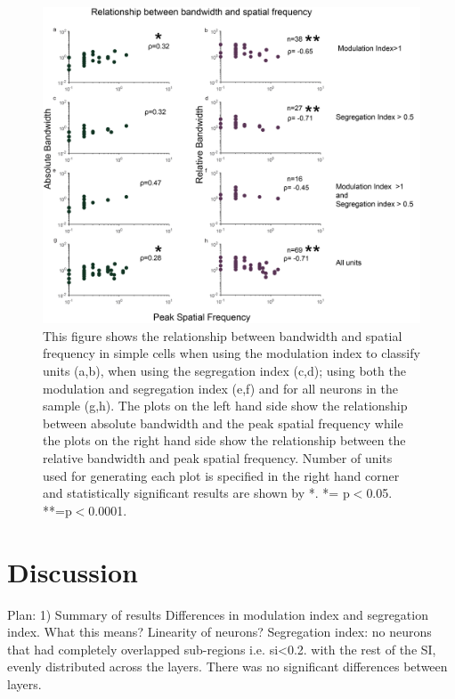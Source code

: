 		\begin{figure}[]
		
		\includegraphics[width=\linewidth]{LinearV1/hwpksf.jpg}
		\caption{This figure shows the relationship between bandwidth and spatial frequency in simple cells when using the modulation index to classify units (a,b), when using the segregation index (c,d); using both the modulation and segregation index (e,f) and for all neurons in the sample (g,h). The plots on the left hand side show the relationship between absolute bandwidth and the peak spatial frequency while the plots on the right hand side show the relationship between the relative bandwidth and peak spatial frequency. Number of units used for generating each plot is specified in the right hand corner and statistically significant results are shown by *. *= p$<$0.05. **=p$<$0.0001.}
		\label{fig:fig6}
	\end{figure}
	
	
	\section{Discussion}
	
	Plan:
	1) Summary of results
		Differences in modulation index and segregation index. What this means? Linearity of neurons?
		Segregation index: no neurons that had completely overlapped sub-regions i.e. si<0.2.
		with the rest of the SI, evenly distributed across the layers.
		There was no significant differences between layers.

